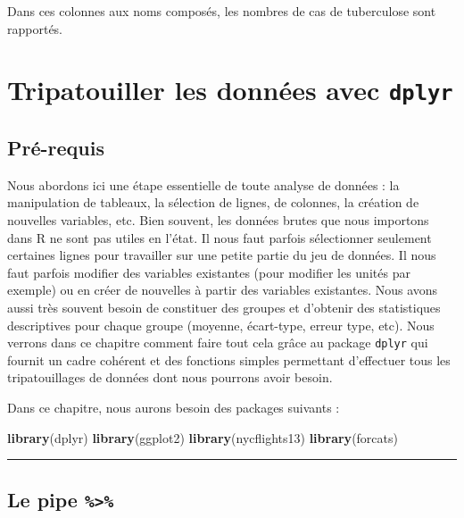 \documentclass[
  a4paper,
]{article}
\newenvironment{Shaded}{\begin{snugshade}}{\end{snugshade}}
\newcommand{\KeywordTok}[1]{\textcolor[rgb]{0.12,0.11,0.11}{\textbf{#1}}}
\newcommand{\NormalTok}[1]{\textcolor[rgb]{0.12,0.11,0.11}{#1}}
\begin{document}
Dans ces colonnes aux noms composés, les nombres de cas de tuberculose sont rapportés.

\hypertarget{wrangling}{%
\section{\texorpdfstring{Tripatouiller les données avec \texttt{dplyr}}{Tripatouiller les données avec dplyr}}\label{wrangling}}

\hypertarget{pruxe9-requis}{%
\subsection{Pré-requis}\label{pruxe9-requis}}

Nous abordons ici une étape essentielle de toute analyse de données : la manipulation de tableaux, la sélection de lignes, de colonnes, la création de nouvelles variables, etc. Bien souvent, les données brutes que nous importons dans R ne sont pas utiles en l'état. Il nous faut parfois sélectionner seulement certaines lignes pour travailler sur une petite partie du jeu de données. Il nous faut parfois modifier des variables existantes (pour modifier les unités par exemple) ou en créer de nouvelles à partir des variables existantes. Nous avons aussi très souvent besoin de constituer des groupes et d'obtenir des statistiques descriptives pour chaque groupe (moyenne, écart-type, erreur type, etc). Nous verrons dans ce chapitre comment faire tout cela grâce au package \texttt{dplyr} qui fournit un cadre cohérent et des fonctions simples permettant d'effectuer tous les tripatouillages de données dont nous pourrons avoir besoin.

Dans ce chapitre, nous aurons besoin des packages suivants :

\begin{Shaded}
\begin{Highlighting}[]
\KeywordTok{library}\NormalTok{(dplyr)}
\KeywordTok{library}\NormalTok{(ggplot2)}
\KeywordTok{library}\NormalTok{(nycflights13)}
\KeywordTok{library}\NormalTok{(forcats)}
\end{Highlighting}
\end{Shaded}

\begin{center}\rule{0.5\linewidth}{0.5pt}\end{center}

\hypertarget{le-pipe}{%
\subsection{\texorpdfstring{Le pipe \texttt{\%\textgreater{}\%}}{Le pipe \%\textgreater\%}}\label{le-pipe}}
\end{document}
